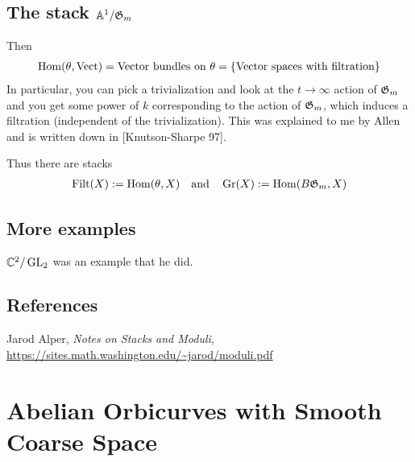 \documentclass[12pt]{article}
\begin{document}
\subsection{The stack $\mathbb{A}^1/\mathfrak{G}_m$}
 Then \begin{align*}
    \operatorname{Hom}(\theta,\operatorname{Vect}) = \text{Vector bundles on } \theta = \{\text{Vector spaces with filtration}\}
\end{align*} In particular, you can pick a trivialization and look at the $t\to\infty$ 
action of $\mathfrak{G}_m$ and you get some power of $k$ corresponding to the action of $\mathfrak{G}_m$,
which induces a filtration (independent of the trivialization). This was explained to me 
by Allen and is written down in [Knutson-Sharpe 97].

\hfill

Thus there are stacks \begin{align*}
    \text{Filt}(X) := \operatorname{Hom}(\theta,X) \quad \text{and} \quad \operatorname{Gr}(X) := \operatorname{Hom}(B\mathfrak{G}_m,X)
\end{align*}

\subsection{More examples}
\begin{example}
    $\mathbb{C}^2/\operatorname{GL}_2$ was an example that he did.
\end{example}
\subsection{References}
\begin{thebibliography}{9}
     Jarod Alper, \textit{Notes on Stacks and Moduli}, \url{https://sites.math.washington.edu/~jarod/moduli.pdf}
\end{thebibliography}

\section{Abelian Orbicurves with Smooth Coarse Space}
\end{document}
